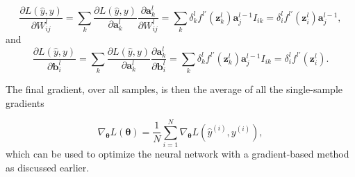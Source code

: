 \begin{equation}\label{eq:derivweights}
    \frac{\partial L(\hat{y}, y)}{\partial W^l_{ij}} = 
    \sum_k \frac{\partial L(\hat{y}, y)}{\partial \boldsymbol{a}^{l}_k} \frac{\partial \boldsymbol{a}^{l}_k}{\partial W^l_{ij}} = 
    \sum_k \delta^{l}_k f^{l\prime}(\boldsymbol{z}^{l}_k)\boldsymbol{a}^{l-1}_j I_{ik}=
    \delta^{l}_i f^{l\prime}(\boldsymbol{z}^l_i) \boldsymbol{a}^{l-1}_j,
\end{equation}
and
\begin{equation}\label{eq:derivbiases}
    \frac{\partial L(\hat{y}, y)}{\partial \boldsymbol{b}^l_{i}} = 
    \sum_k \frac{\partial L(\hat{y}, y)}{\partial \boldsymbol{a}^{l}_k} \frac{\partial \boldsymbol{a}^{l}_k}{\partial \boldsymbol{b}^l_{i}} = 
    \sum_k \delta^{l}_k f^{l\prime}(\boldsymbol{z}^{l}_k)\boldsymbol{a}^{l-1}_j I_{ik}=
    \delta^{l}_i f^{l\prime}(\boldsymbol{z}^l_i).
\end{equation}

The final gradient, over all samples, is then the average of all the single-sample gradients

\begin{equation}\label{eq:averageGradient}
    \nabla_{\boldsymbol{\theta}} L(\boldsymbol{\theta}) = \frac{1}{N}\sum_{i=1}^N \nabla_{\boldsymbol{\theta}} L(\hat{y}^{(i)}, y^{(i)}),
\end{equation}
which can be used to optimize the neural network with a gradient-based method as discussed earlier.